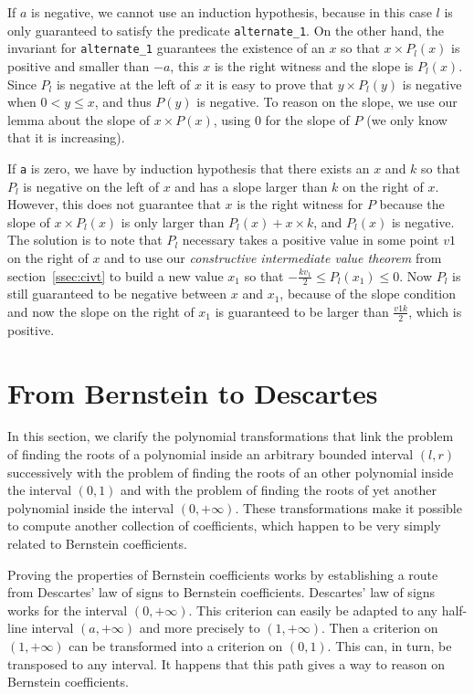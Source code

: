 \documentclass{mscs}
\begin{document}
If \(a\) is negative, we cannot use an induction hypothesis, because in
this case \(l\) is only guaranteed to satisfy the predicate
{\tt alternate\_1}.  On the other hand, the invariant for {\tt alternate\_1}
guarantees the existence of an \(x\) so that \(x\times P_l(x)\) is positive
and smaller than \(-a\), this \(x\) is the right witness and the slope is
\(P_l(x)\).  Since \(P_l\) is negative at the left of \(x\) it is easy to
prove that \(y\times P_l(y)\) is negative when \(0 < y \leq x\), and thus
\(P(y)\) is negative.  To reason on the slope, we use our lemma about the
slope of \(x \times P(x)\), using \(0\) for the slope of \(P\) (we only
know that it is increasing).

If {\tt a} is
zero, we have by induction hypothesis that there exists an \(x\) and \(k\)
so that \(P_l\) is negative on the left of \(x\) and has a slope larger than
\(k\) on the right of \(x\).  However, this does not guarantee that \(x\) is
the right witness for \(P\) because the slope of \(x\times P_l(x)\) is only
larger than \(P_l(x) + x \times k\), and \(P_l(x)\) is negative.  The solution
is to note that \(P_l\) necessary takes a positive value in some point \(v1\)
on the right of \(x\) and to use our
{\em constructive intermediate value theorem} from
section~\ref{ssec:civt} to
build a new value \(x_1\) so that \(-\frac{k v_1}{2} \leq P_l(x_1) \leq 0\).
Now \(P_l\) is still guaranteed to be negative between \(x\) and \(x_1\),
because of the slope condition and now the slope on the right of \(x_1\) is
guaranteed to be larger than \(\frac{v1 k}{2}\), which is positive.

\section{From Bernstein to Descartes}\label{sec:Bernstein}
In this section, we clarify the polynomial transformations that link
the problem of finding the roots of a polynomial inside an arbitrary
bounded interval \((l,r)\) successively with the problem of finding
the roots of an other polynomial inside the interval \((0,1)\) and
with the problem of finding the roots of yet another polynomial inside
the interval \((0,+\infty)\).  These transformations make it possible to
compute another collection of coefficients, which happen to be very simply
related to Bernstein coefficients.

Proving the properties of Bernstein coefficients works by establishing
a route from Descartes' law of signs to Bernstein coefficients.  Descartes'
law of signs works for the interval \((0,+\infty)\).  This criterion
can easily be adapted to any half-line interval \((a,+\infty)\) and
more precisely to \((1,+\infty)\).  Then a criterion on \((1,+\infty)\)
can be transformed into a criterion on \((0,1)\). This can, in turn,
be transposed to any interval.  It happens that this path gives a way to
reason on Bernstein coefficients.
\end{document}
